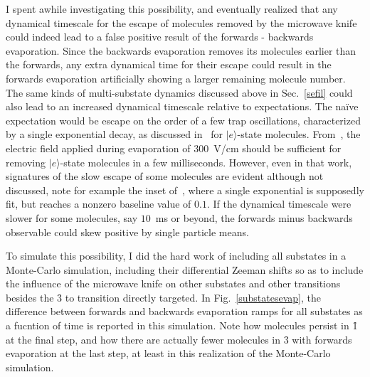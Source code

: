 I spent awhile investigating this possibility, and eventually realized that any dynamical timescale for the escape of molecules removed by the microwave knife could indeed lead to a false positive result of the forwards - backwards evaporation. 
Since the backwards evaporation removes its molecules earlier than the forwards, any extra dynamical time for their escape could result in the forwards evaporation artificially showing a larger remaining molecule number.
The same kinds of multi-substate dynamics discussed above in Sec.~\ref{sefil} could also lead to an increased dynamical timescale relative to expectations.
The na\"{i}ve expectation would be escape on the order of a few trap oscillations, characterized by a single exponential decay, as discussed in~\cite{Stuhl2012uwave} for $|e\rangle$-state molecules.
From~\citep[Fig.~4]{Stuhl2012uwave}, the electric field applied during evaporation of $300$~V/cm should be sufficient for removing $|e\rangle$-state molecules in a few milliseconds.
However, even in that work, signatures of the slow escape of some molecules are evident although not discussed, note for example the inset of~\citep[Fig.~3]{Stuhl2012uwave}, where a single exponential is supposedly fit, but reaches a nonzero baseline value of $0.1$.
If the dynamical timescale were slower for some molecules, say $10$~ms or beyond, the forwards minus backwards observable could skew positive by single particle means.

To simulate this possibility, I did the hard work of including all substates in a Monte-Carlo simulation, including their differential Zeeman shifts so as to include the influence of the microwave knife on other substates and other transitions besides the \f3 to  transition directly targeted.
In Fig.~\ref{substatesevap}, the difference between forwards and backwards evaporation ramps for all substates as a fucntion of time is reported in this simulation.
Note how molecules persist in \f1 at the final step, and how there are actually fewer molecules in \f3 with forwards evaporation at the last step, at least in this realization of the Monte-Carlo simulation.


